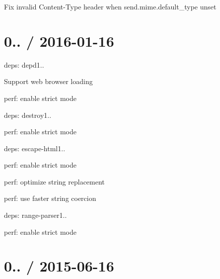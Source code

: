 \begin{DoxyItemize}
\item Fix invalid {\ttfamily Content-\/\+Type} header when {\ttfamily send.\+mime.\+default\+\_\+type} unset
\end{DoxyItemize}

\section*{0.. / 2016-\/01-\/16 }


\begin{DoxyItemize}
\item deps\+: depd1..
\begin{DoxyItemize}
\item Support web browser loading
\item perf\+: enable strict mode
\end{DoxyItemize}
\item deps\+: destroy1..
\begin{DoxyItemize}
\item perf\+: enable strict mode
\end{DoxyItemize}
\item deps\+: escape-\/html1..
\begin{DoxyItemize}
\item perf\+: enable strict mode
\item perf\+: optimize string replacement
\item perf\+: use faster string coercion
\end{DoxyItemize}
\item deps\+: range-\/parser1..
\begin{DoxyItemize}
\item perf\+: enable strict mode
\end{DoxyItemize}
\end{DoxyItemize}

\section*{0.. / 2015-\/06-\/16 }


